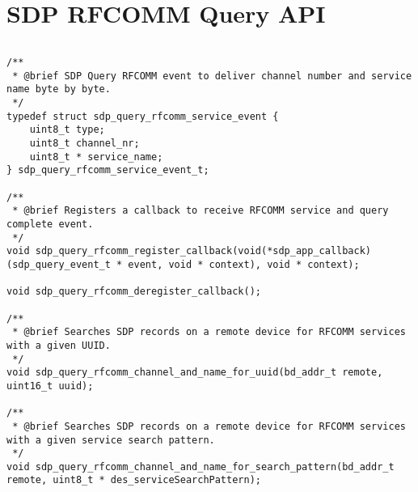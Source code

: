 \section{SDP RFCOMM Query API}
\label{appendix:api_sdp_queries}
$ $
\begin{lstlisting}
/** 
 * @brief SDP Query RFCOMM event to deliver channel number and service name byte by byte.
 */
typedef struct sdp_query_rfcomm_service_event {
    uint8_t type;
    uint8_t channel_nr;
    uint8_t * service_name;
} sdp_query_rfcomm_service_event_t;

/** 
 * @brief Registers a callback to receive RFCOMM service and query complete event. 
 */
void sdp_query_rfcomm_register_callback(void(*sdp_app_callback)(sdp_query_event_t * event, void * context), void * context);

void sdp_query_rfcomm_deregister_callback();

/** 
 * @brief Searches SDP records on a remote device for RFCOMM services with a given UUID.
 */
void sdp_query_rfcomm_channel_and_name_for_uuid(bd_addr_t remote, uint16_t uuid);

/** 
 * @brief Searches SDP records on a remote device for RFCOMM services with a given service search pattern.
 */
void sdp_query_rfcomm_channel_and_name_for_search_pattern(bd_addr_t remote, uint8_t * des_serviceSearchPattern);
\end{lstlisting}
\pagebreak
